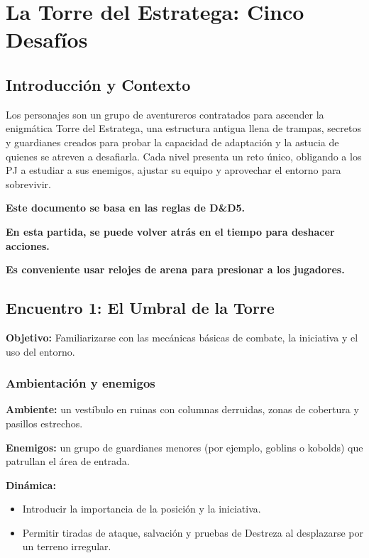 \documentclass[
  twocolumn]{article}
\author{}
\date{}
\begin{document}
\section{La Torre del Estratega: Cinco
Desafíos}\label{la-torre-del-estratega-cinco-desafuxedos}

\subsection{Introducción y Contexto}\label{introducciuxf3n-y-contexto}

Los personajes son un grupo de aventureros contratados para ascender la
enigmática Torre del Estratega, una estructura antigua llena de trampas,
secretos y guardianes creados para probar la capacidad de adaptación y
la astucia de quienes se atreven a desafiarla. Cada nivel presenta un
reto único, obligando a los PJ a estudiar a sus enemigos, ajustar su
equipo y aprovechar el entorno para sobrevivir.

\textbf{Este documento se basa en las reglas de D\&D5.}

\textbf{En esta partida, se puede volver atrás en el tiempo para
deshacer acciones.}

\textbf{Es conveniente usar relojes de arena para presionar a los
jugadores.}

\subsection{Encuentro 1: El Umbral de la
Torre}\label{encuentro-1-el-umbral-de-la-torre}

\textbf{Objetivo:} Familiarizarse con las mecánicas básicas de combate,
la iniciativa y el uso del entorno.

\subsubsection{Ambientación y
enemigos}\label{ambientaciuxf3n-y-enemigos}

\textbf{Ambiente:} un vestíbulo en ruinas con columnas derruidas, zonas
de cobertura y pasillos estrechos.

\textbf{Enemigos:} un grupo de guardianes menores (por ejemplo, goblins
o kobolds) que patrullan el área de entrada.

\textbf{Dinámica:}

\begin{itemize}
\item
  Introducir la importancia de la posición y la iniciativa.
\item
  Permitir tiradas de ataque, salvación y pruebas de Destreza al
  desplazarse por un terreno irregular.
\end{itemize}
\end{document}
